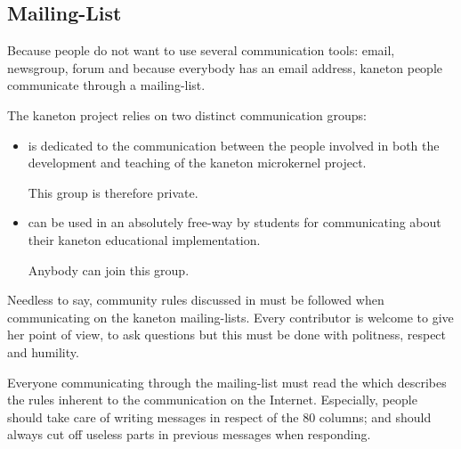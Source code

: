 %
%
%
%
%
%

%
%

\subsection{Mailing-List}
\label{section:mailing-list}

Because people do not want to use several communication tools: email,
newsgroup, forum \etc{} and because everybody has an email address,
kaneton people communicate through a mailing-list.

The kaneton project relies on two distinct communication groups:

\begin{itemize}
  \item
     is dedicated to the communication
    between the people involved in both the development and teaching of the
    kaneton microkernel project.

    \-

    This group is therefore private.
  \item
     can be used in an absolutely
    free-way by students for communicating about their kaneton educational
    implementation.

    \-

    Anybody can join this group.
\end{itemize}

Needless to say, community rules discussed in  must be followed when communicating on the kaneton
mailing-lists. Every contributor is welcome to give her point of view, to
ask questions \etc{} but this must be done with politness, respect and
humility.

Everyone communicating through the mailing-list must read the
 which describes the rules inherent to the communication
on the Internet. Especially, people should take care of writing messages in
respect of the $80$ columns; and should always cut off useless parts
in previous messages when responding.

